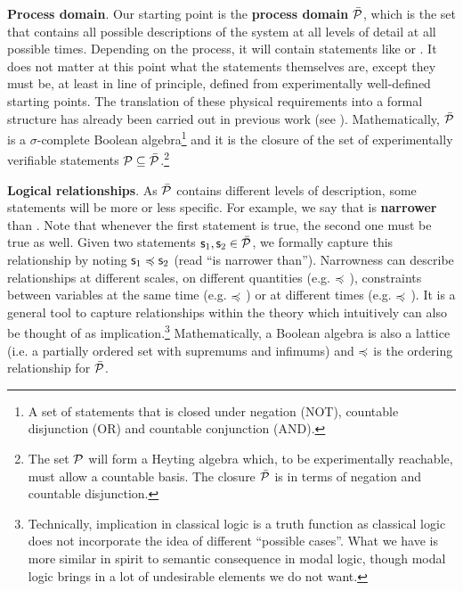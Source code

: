 \documentclass[10pt, onecolumn, longbibliography, nofootinbib]{revtex4-2}
\begin{document}
\textbf{Process domain}. Our starting point is the \textbf{process domain} $\tdomain[P]$, which is the set that contains all possible descriptions of the system at all levels of detail at all possible times. Depending on the process, it will contain statements like  or . It does not matter at this point what the statements themselves are, except they must be, at least in line of principle, defined from experimentally well-defined starting points. The translation of these physical requirements into a formal structure has already been carried out in previous work (see \cite{aop-book}). Mathematically, $\tdomain[P]$ is a $\sigma$-complete Boolean algebra\footnote{A set of statements that is closed under negation (NOT), countable disjunction (OR) and countable conjunction (AND).} and it is the closure of the set of experimentally verifiable statements $\edomain[P] \subseteq \tdomain[P]$.\footnote{The set $\edomain[P]$ will form a Heyting algebra which, to be experimentally reachable, must allow a countable basis. The closure $\tdomain[P]$ is in terms of negation and countable disjunction.}

\textbf{Logical relationships}. As $\tdomain[P]$ contains different levels of description, some statements will be more or less specific. For example, we say that  is \textbf{narrower} than . Note that whenever the first statement is true, the second one must be true as well. Given two statements $\stmt_1, \stmt_2 \in \tdomain[P]$, we formally capture this relationship by noting $\stmt_1 \narrower \stmt_2$ (read ``is narrower than''). Narrowness can describe relationships at different scales, on different quantities (e.g.  $\narrower$ ), constraints between variables at the same time (e.g.  $\narrower$ ) or at different times (e.g.  $\narrower$ ). It is a general tool to capture relationships within the theory which intuitively can also be thought of as implication.\footnote{Technically, implication in classical logic is a truth function as classical logic does not incorporate the idea of different ``possible cases''. What we have is more similar in spirit to semantic consequence in modal logic, though modal logic brings in a lot of undesirable elements we do not want.} Mathematically, a Boolean algebra is also a lattice (i.e. a partially ordered set with supremums and infimums) and $\narrower$ is the ordering relationship for $\tdomain[P]$.
\end{document}

